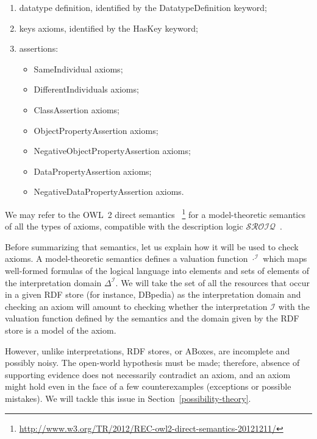 \documentclass[a4paper]{article}
\newcounter{ex}
\begin{document}
\begin{enumerate}
\begin{itemize}
  \end{itemize}
\item datatype definition, identified by the \textsf{DatatypeDefinition} keyword;
\item keys axioms, identified by the \textsf{HasKey} keyword;
\item assertions:
  \begin{itemize}
  \item \textsf{SameIndividual} axioms;
  \item \textsf{DifferentIndividuals} axioms;
  \item \textsf{ClassAssertion} axioms;
  \item \textsf{ObjectPropertyAssertion} axioms;
  \item \textsf{NegativeObjectPropertyAssertion} axioms;
  \item \textsf{DataPropertyAssertion} axioms;
  \item \textsf{NegativeDataPropertyAssertion} axioms.
  \end{itemize}
\end{enumerate}
We may refer to the OWL~2 direct semantics~\cite{OWL2-direct-semantics}
\footnote{\url{http://www.w3.org/TR/2012/REC-owl2-direct-semantics-20121211/}}
for a model-theoretic semantics of all the types of axioms, compatible with
the description logic $\mathcal{SROIQ}$~\cite{HorrocksKutzSattler2006}.

Before summarizing that semantics, let us explain how it will be used to
check axioms. A model-theoretic semantics defines a valuation function
$\cdot^\mathcal{I}$ which maps well-formed formulas of the logical language into
elements and sets of elements of the interpretation domain $\Delta^\mathcal{I}$.
We will take the set of all the resources that occur in a given RDF store
(for instance, DBpedia) as the interpretation domain and checking an axiom
will amount to checking whether the interpretation $\mathcal{I}$ with the
valuation function defined by the semantics and the domain given by the
RDF store is a model of the axiom.

However, unlike interpretations, RDF stores, or ABoxes, are incomplete and
possibly noisy. The open-world hypothesis must be made; therefore, absence of
supporting evidence does not necessarily contradict an axiom, and an axiom might
hold even in the face of a few counterexamples (exceptions or possible mistakes).
We will tackle this issue in Section~\ref{possibility-theory}.
\end{document}
